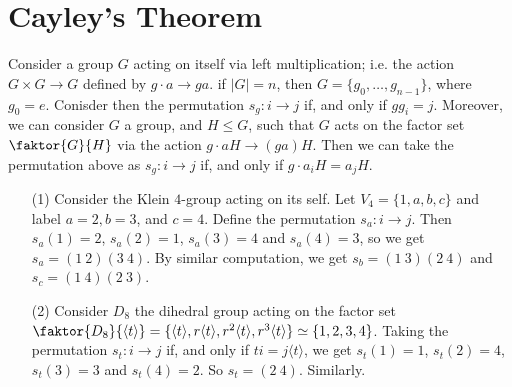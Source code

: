 \section{Cayley's Theorem}
\label{section_4.2}

Consider a group $G$ acting on itself via left multiplication; i.e. the action
$G \times G \xrightarrow{} G$ defined by $g \cdot a \xrightarrow{} ga$. if
$|G|=n$, then $G=\{g_0, \dots, g_{n-1}\}$, where $g_0=e$. Conisder then the
permutation $s_g:i \xrightarrow{} j$ if, and only if $gg_i=j$. Moreover, we can
consider $G$ a group, and  $H \leq G$, such that $G$ acts on the factor set
$\faktor{G}{H}$ via the action $g \cdot aH \xrightarrow{} (ga)H$. Then we can
take the permutation above as $s_g:i \xrightarrow{} j$ if, and only if $g \cdot
a_iH=a_jH$.

\begin{example}\label{examle_4.5}
  \begin{enumerate}
    \item[(1)] Consider the Klein $4$-group acting on its self. Let
      $V_4=\{1, a,b,c\}$ and label $a=2,b=3$, and  $c=4$. Define the
      permutation $s_a:i \xrightarrow{} j$. Then $s_a(1)=2$, $s_a(2)=1$,
      $s_a(3)=4$ and $s_a(4)=3$, so we get $s_a=(1 \ 2)(3 \ 4)$. By
      similar computation, we get $s_b=(1 \ 3)(2 \ 4)$ and $s_c=(1 \ 4)(2
      \ 3)$.

    \item[(2)] Consider $D_8$ the dihedral group acting on the factor set
      $\faktor{D_8}{\langle t \rangle}=\{\langle t \rangle, r \langle t
      \rangle, r^2 \langle t \rangle, r^3 \langle t \rangle\} \simeq
      \{1,2,3,4\}$. Taking the permutation $s_t:i \xrightarrow{} j$ if,
      and only if $ti=j\langle t \rangle$, we get $s_t(1)=1$, $s_t(2)=4$,
      $s_t(3)=3$ and $s_t(4)=2$. So $s_t=(2 \ 4)$. Similarly.
  \end{enumerate}
\end{example}


